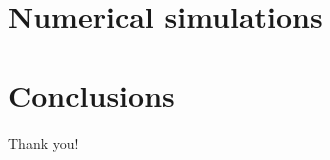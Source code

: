 \documentclass{beamer}
\begin{document}
\section{Numerical simulations}


\begin{frame}
\end{frame}


\section{Conclusions}

\begin{frame}[standout]
Thank you!
\end{frame}
\end{document}
